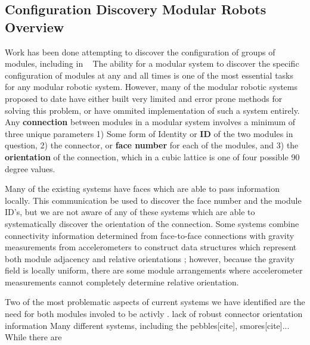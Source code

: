 \subsection{Configuration Discovery Modular Robots Overview}
\label{sec:RWconfiguration}
	
	Work has been done attempting to discover the configuration of groups of modules, including in ~\cite{park2008automatic}
	The ability for a modular system to discover the specific configuration of modules at any and all times is one of the most essential tasks for any modular robotic system. However, many of the modular robotic systems proposed to date have either built very limited and error prone methods for solving this problem, or have ommited implementation of such a system entirely. Any \textbf{connection} between modules in a modular system involves a minimum of three unique parameters 1) Some form of Identity or \textbf{ID} of the two modules in question, 2) the connector, or \textbf{face number} for each of the modules, and 3) the \textbf{orientation} of the connection, which in a cubic lattice is one of four possible 90 degree values.

	Many of the existing systems have faces which are able to pass information locally. This communication be used to discover the face number and the module ID's, but we are not aware of any of these systems which are able to systematically discover the orientation of the connection. Some systems combine connectivity information determined from face-to-face connections with gravity measurements from accelerometers to construct data structures which represent both module adjacency and relative orientations \cite{Soldercubes2016}; however, because the gravity field is locally uniform, there are some module arrangements where accelerometer measurements cannot completely determine relative orientation.

	Two of the most problematic aspects of current systems we have identified are the need for both modules involed to be activly . lack of robust connector orientation information
	Many different systems, including the pebbles[cite], smores[cite]... While there are


